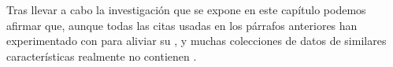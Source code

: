 Tras llevar a cabo la investigación que se expone en este capítulo podemos afirmar que, aunque todas las citas usadas en los párrafos anteriores han experimentado con \mushroom para aliviar su \dilemaIR, \mushroom y muchas colecciones de datos de similares características realmente no contienen \IRs.










